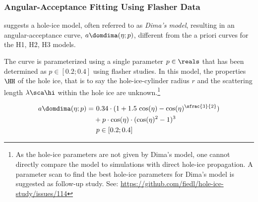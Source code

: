 \subsubsection{Angular-Acceptance Fitting Using Flasher Data}
\label{sec:dimas_model}

%
%
%
%
%
\chirkin suggests a hole-ice model, often referred to as \textit{Dima's model}, resulting in an angular-acceptance curve, $a\domdima(\eta;p)$, different from the a priori curves for the H1, H2, H3 models. \cite{flasherdataderivedicemodels}


The curve is parameterized using a single parameter $p\in\reals$ that has been determined as $p \in [0.2;0.4]$ using flasher studies. \cite{msuforwardholeice} In this model, the properties $\HH$ of the hole ice, that is to say the hole-ice-cylinder radius $r$ and the scattering length $\lambda\sca\hi$ within the hole ice are unknown.\footnote{As the hole-ice parameters are not given by Dima's model, one cannot directly compare the model to \clsim simulations with direct hole-ice propagation. A parameter scan to find the best hole-ice parameters for Dima's model is suggested as follow-up study. See: \url{https://github.com/fiedl/hole-ice-study/issues/114} \followup}

\begin{align}
  a\domdima(\eta;p) = & \ 0.34 \cdot (1 + 1.5\,\cos(\eta) - \cos(\eta)^{\sfrac{3}{2}}) \nonumber \\
      & + p \cdot \cos(\eta) \cdot  (\cos(\eta)^2 - 1)^3 \\
      & \ p \in [0.2;0.4] \nonumber
  \label{eq:adima}
\end{align}

